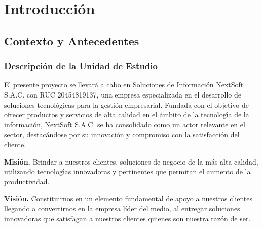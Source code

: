\documentclass[stu, 12pt, letterpaper, donotrepeattitle, floatsintext, natbib]{apa7}
\begin{document}
\section{\large Introducci\'on}
\subsection{Contexto y Antecedentes}
\subsubsection{Descripci\'on de la Unidad de Estudio}
El presente proyecto se llevar\'a a cabo en Soluciones de Informaci\'on NextSoft S.A.C. con RUC 20454819137, una empresa especializada en el desarrollo de soluciones tecnol\'ogicas para la gesti\'on empresarial.
Fundada con el objetivo de ofrecer productos y servicios de alta calidad en el \'ambito de la tecnolog\'{\i}a de la informaci\'on, NextSoft S.A.C. se ha consolidado como un actor relevante en el sector, destac\'andose
por su innovaci\'on y compromiso con la satisfacci\'on del cliente.

\textbf{Misi\'on. }Brindar a nuestros clientes, soluciones de negocio de la m\'as alta calidad, utilizando tecnolog\'{\i}as innovadoras y pertinentes que permitan el aumento de la productividad.

\textbf{Visi\'on. }Constituirnos en un elemento fundamental de apoyo a nuestros clientes llegando a convertirnos en la empresa líder del medio, al entregar soluciones innovadoras que satisfagan a nuestros clientes quienes
son nuestra raz\'on de ser.
\end{document}
